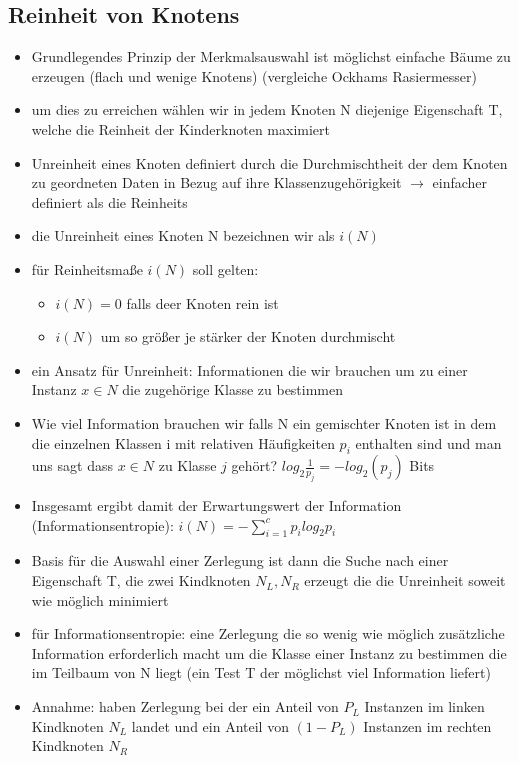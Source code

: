 \documentclass{article} %
\begin{document}
	\subsection{Reinheit von Knotens}
	\begin{itemize}
		\item Grundlegendes Prinzip der Merkmalsauswahl ist möglichst einfache Bäume zu erzeugen (flach und wenige Knotens) (vergleiche Ockhams Rasiermesser)
		\item um dies zu erreichen wählen wir in jedem Knoten N diejenige Eigenschaft T, welche die Reinheit der Kinderknoten maximiert
		\item Unreinheit eines Knoten definiert durch die Durchmischtheit der dem Knoten zu geordneten Daten in Bezug auf ihre Klassenzugehörigkeit $\rightarrow$ einfacher definiert als die Reinheits
		\item die Unreinheit eines Knoten N bezeichnen wir als $i(N)$
		\item für Reinheitsmaße $i(N)$ soll gelten:
		\begin{itemize}
			\item $i(N) = 0$ falls deer Knoten rein ist
			\item $i(N)$ um so größer je stärker der Knoten durchmischt
		\end{itemize}
		\item ein Ansatz für Unreinheit: Informationen die wir brauchen um zu einer Instanz $x \in N$ die zugehörige Klasse zu bestimmen
		\item Wie viel Information brauchen wir falls N ein gemischter Knoten ist in dem die einzelnen Klassen i mit relativen Häufigkeiten $p_i$ enthalten sind und man uns sagt dass $x \in N$ zu Klasse $j$ gehört? $log_2 \frac{1}{p_j} = -log_2(p_j)$ Bits
		\item Insgesamt ergibt damit der Erwartungswert der Information (Informationsentropie): $i(N) = -\sum_{i=1}^{c}p_i log_2 p_i$
		\item Basis für die Auswahl einer Zerlegung ist dann die Suche nach einer Eigenschaft T, die zwei Kindknoten $N_L,N_R$ erzeugt die die Unreinheit soweit wie möglich minimiert
		\item für Informationsentropie: eine Zerlegung die so wenig wie möglich zusätzliche Information erforderlich macht um die Klasse einer Instanz zu bestimmen die im Teilbaum von N liegt (ein Test T der möglichst viel Information liefert)
		\item Annahme: haben Zerlegung bei der ein Anteil von $P_L$ Instanzen im linken Kindknoten $N_L$ landet und ein Anteil von $(1-P_L)$ Instanzen im rechten Kindknoten $N_R$

\end{itemize}
\end{document}
